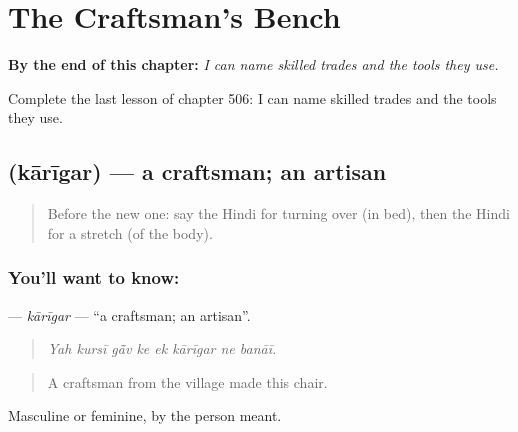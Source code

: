 
\chapter{The Craftsman's Bench}
\label{ch:hi-the-craftsman-s-bench}

\begin{chapteropening}
\textbf{By the end of this chapter:} \emph{I can name skilled trades and the tools they use.}

Complete the last lesson of chapter 506: I can name skilled trades and the tools they use.
\end{chapteropening}

\section[\texorpdfstring{\hi{कारीगर} (kārīgar)}{कारीगर (kārīgar)}]{ (kārīgar) — a craftsman; an artisan}

\label{lesson:HI-C506-karigar}



\begin{quote}
Before the new one: say the Hindi for turning over (in bed), then the Hindi for a stretch (of the body).
\end{quote}

\subsection*{You'll want to know: }
\textbf{} — \emph{kārīgar} — \textquotedblleft{}a craftsman; an artisan\textquotedblright{}.

\begin{quote}
       
\end{quote}

\begin{quote}
\emph{Yah kursī gā̃v ke ek kārīgar ne banāī.}
\end{quote}

\begin{quote}
A craftsman from the village made this chair.
\end{quote}

Masculine or feminine, by the person meant.

